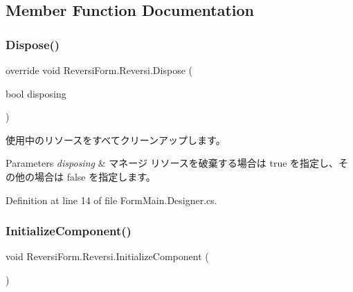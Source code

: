 \subsection{Member Function Documentation}
\mbox{\label{class_reversi_form_1_1_reversi_ac021c14c28e588c11445e460ec7e87d1}} 
\subsubsection{\texorpdfstring{Dispose()}{Dispose()}}
{\footnotesize\ttfamily override void Reversi\+Form.\+Reversi.\+Dispose (\begin{DoxyParamCaption}\item[{bool}]{disposing }\end{DoxyParamCaption})\hspace{0.3cm}{\ttfamily [protected]}}



使用中のリソースをすべてクリーンアップします。 


\begin{DoxyParams}{Parameters}
{\em disposing} & マネージ リソースを破棄する場合は true を指定し、その他の場合は false を指定します。\\
\hline
\end{DoxyParams}


Definition at line 14 of file Form\+Main.\+Designer.\+cs.

\mbox{\label{class_reversi_form_1_1_reversi_abec0816dd006d05b512d86b45a20af68}} 
\subsubsection{\texorpdfstring{Initialize\+Component()}{InitializeComponent()}}
{\footnotesize\ttfamily void Reversi\+Form.\+Reversi.\+Initialize\+Component (\begin{DoxyParamCaption}{ }\end{DoxyParamCaption})\hspace{0.3cm}{\ttfamily [private]}}



